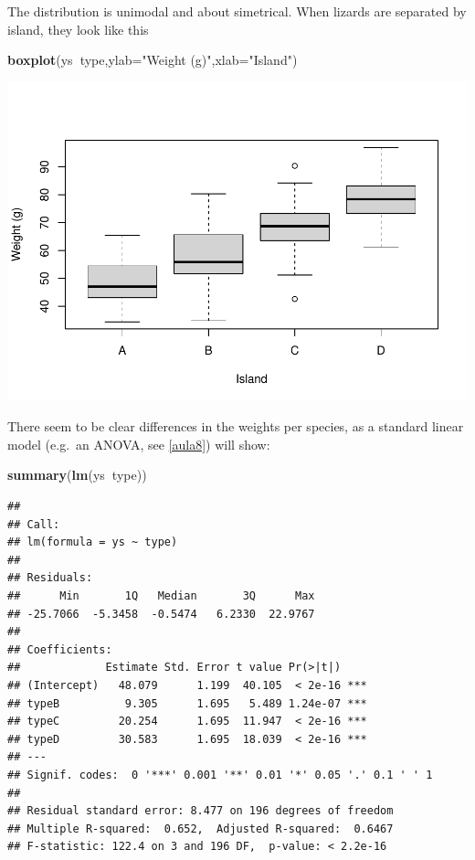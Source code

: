 \documentclass[
]{book}
\newenvironment{Shaded}{\begin{snugshade}}{\end{snugshade}}
\newcommand{\DataTypeTok}[1]{\textcolor[rgb]{0.13,0.29,0.53}{#1}}
\newcommand{\KeywordTok}[1]{\textcolor[rgb]{0.13,0.29,0.53}{\textbf{#1}}}
\newcommand{\NormalTok}[1]{#1}
\newcommand{\OperatorTok}[1]{\textcolor[rgb]{0.81,0.36,0.00}{\textbf{#1}}}
\newcommand{\StringTok}[1]{\textcolor[rgb]{0.31,0.60,0.02}{#1}}
\begin{document}
The distribution is unimodal and about simetrical. When lizards are separated by island, they look like this

\begin{Shaded}
\begin{Highlighting}[]
\KeywordTok{boxplot}\NormalTok{(ys}\OperatorTok{~}\NormalTok{type,}\DataTypeTok{ylab=}\StringTok{"Weight (g)"}\NormalTok{,}\DataTypeTok{xlab=}\StringTok{"Island"}\NormalTok{)}
\end{Highlighting}
\end{Shaded}

\includegraphics{ECOMODbook_files/figure-latex/a10.3-1.pdf}

There seem to be clear differences in the weights per species, as a standard linear model (e.g.~an ANOVA, see \ref{aula8}) will show:

\begin{Shaded}
\begin{Highlighting}[]
\KeywordTok{summary}\NormalTok{(}\KeywordTok{lm}\NormalTok{(ys}\OperatorTok{~}\NormalTok{type))}
\end{Highlighting}
\end{Shaded}

\begin{verbatim}
## 
## Call:
## lm(formula = ys ~ type)
## 
## Residuals:
##      Min       1Q   Median       3Q      Max 
## -25.7066  -5.3458  -0.5474   6.2330  22.9767 
## 
## Coefficients:
##             Estimate Std. Error t value Pr(>|t|)    
## (Intercept)   48.079      1.199  40.105  < 2e-16 ***
## typeB          9.305      1.695   5.489 1.24e-07 ***
## typeC         20.254      1.695  11.947  < 2e-16 ***
## typeD         30.583      1.695  18.039  < 2e-16 ***
## ---
## Signif. codes:  0 '***' 0.001 '**' 0.01 '*' 0.05 '.' 0.1 ' ' 1
## 
## Residual standard error: 8.477 on 196 degrees of freedom
## Multiple R-squared:  0.652,	Adjusted R-squared:  0.6467 
## F-statistic: 122.4 on 3 and 196 DF,  p-value: < 2.2e-16
\end{verbatim}
\end{document}
